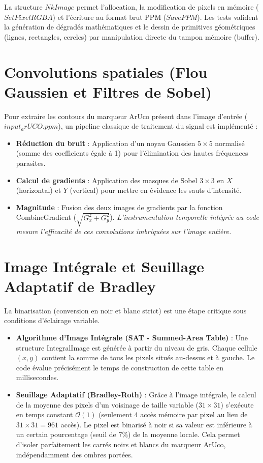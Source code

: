 \documentclass[12pt,a4paper]{report}
\begin{document}
La structure $NkImage$ permet l'allocation, la modification de pixels en mémoire ($SetPixelRGBA$) et l'écriture au format brut PPM ($SavePPM$). Les tests valident la génération de dégradés mathématiques et le dessin de primitives géométriques (lignes, rectangles, cercles) par manipulation directe du tampon mémoire (buffer).

\section{Convolutions spatiales (Flou Gaussien et Filtres de Sobel)}

Pour extraire les contours du marqueur ArUco présent dans l'image d'entrée ($input_arUCO.ppm$), un pipeline classique de traitement du signal est implémenté :
\begin{itemize}
    \item \textbf{Réduction du bruit} : Application d'un noyau Gaussien $5 \times 5$ normalisé (somme des coefficients égale à 1) pour l'élimination des hautes fréquences parasites.
    \item \textbf{Calcul de gradients} : Application des masques de Sobel $3 \times 3$ en $X$ (horizontal) et $Y$ (vertical) pour mettre en évidence les sauts d'intensité.
    \item \textbf{Magnitude}  : Fusion des deux images de gradients par la fonction CombineGradient ($\sqrt{G_x^2 + G_y^2}$). 
    \textit{L'instrumentation temporelle intégrée au code mesure l'efficacité de ces convolutions imbriquées sur l'image entière.}
\end{itemize}

\section{Image Intégrale et Seuillage Adaptatif de Bradley}

La binarisation (conversion en noir et blanc strict) est une étape critique sous conditions d'éclairage variable.
\begin{itemize}
    \item \textbf{Algorithme d'Image Intégrale (SAT - Summed-Area Table)} : Une structure IntegralImage est générée à partir du niveau de gris. Chaque cellule $(x,y)$ contient la somme de tous les pixels situés au-dessus et à gauche. Le code évalue précisément le temps de construction de cette table en millisecondes.
    \item \textbf{Seuillage Adaptatif (Bradley-Roth)} : Grâce à l'image intégrale, le calcul de la moyenne des pixels d'un voisinage de taille variable ($31 \times 31$) s'exécute en temps constant $\mathcal{O}(1)$ (seulement 4 accès mémoire par pixel au lieu de $31 \times 31 = 961$ accès). Le pixel est binarisé à noir si sa valeur est inférieure à un certain pourcentage (seuil de $7\%$) de la moyenne locale. Cela permet d'isoler parfaitement les carrés noirs et blancs du marqueur ArUco, indépendamment des ombres portées.
\end{itemize}
\end{document}
